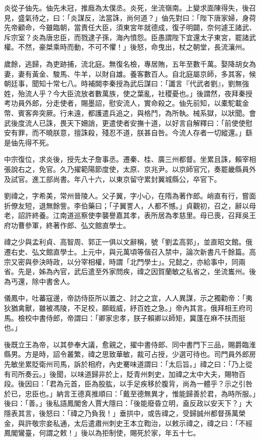 \begin{pinyinscope}
 炎從子伷先。伷先未冠，推廕為太僕丞。炎死，坐流嶺南。上變求面陳得失，後召見，盛氣待之，曰：「炎謀反，法當誅，尚何道？」伷先對曰：「陛下唐家婦，身荷先帝顧命，今雖臨朝，當責任大臣，須東宮年就德成，復子明闢，奈何遽王諸武、斥宗室？炎為唐忠臣，而戮逮子孫，海內憤怨。臣愚謂陛下宜還太子東宮，罷諸武權。不然，豪桀乘時而動，不可不懼！」後怒，命曳出，杖之朝堂，長流瀼州。



 歲餘，逃歸，為吏跡捕，流北庭。無復名檢，專居賄，五年至數千萬。娶降胡女為妻，妻有黃金、駿馬、牛羊，以財自雄。養客數百人。自北庭屬京師，多其客，候朝廷事，聞知十常七八。時補闕李秦授為武后謀曰：「讖言『代武者劉』，劉無強姓，殆流人乎？今大臣流放者數萬族，使之葉亂，社稷憂也。」後謂然，夜拜秦授考功員外郎，分走使者，賜墨詔，慰安流人，實命殺之。伷先前知，以橐駝載金幣、賓客奔突厥。行未遠，都護遣兵追之，與格鬥，為所執。械系獄，以狀聞。會武後度流人已誅，畏天下姍誚，更遣使者安撫十道，以好言自解釋曰：「前使使慰安有罪，而不曉朕意，擅誅殺，殘忍不道，朕甚自咎。今流人存者一切縱還。」繇是伷先得不死。



 中宗復位，求炎後，授先太子詹事丞。遷秦、桂、廣三州都督。坐累且誅，賴宰相張說右之，免官。久乃擢範陽節度使，太原、京兆尹。以京師官冗，奏罷畿縣員外及試官。進工部尚書。年八十六，以東京留守累封翼城縣公，卒官下。



 劉禕之，字希美，常州晉陵人。父子翼，字小心，在隋為著作郎。峭直有行，嘗面折僚友短，退無餘訾。李伯藥曰；「子翼詈人，人都不憾。」貞觀初，召之，辭以母老，詔許終養。江南道巡察使李襲譽嘉其孝，表所居為孝慈里。母已喪，召拜吳王府功曹參軍，終著作郎、弘文館直學士。



 禕之少與孟利貞、高智周、郭正一俱以文辭稱，號「劉孟高郭」，並直昭文館。俄遷右史、弘文館直學士。上元中，與元萬頃等偕召入禁中，論次新書凡千餘篇。高宗又密與參決時政，以分宰相權，時謂「北門學士」。兄懿之，亦給事中，同兩省。先是，姊為內官，武后遣至外家問疾，禕之因賀蘭敏之私省之，坐流巂州。後為丐還，除中書舍人。



 儀鳳中，吐蕃寇邊，帝訪侍臣所以置之、討之之宜，人人異謀，示之獨勸帝：「夷狄猶禽獸，雖被馮陵，不足校，願戢威，紓百姓之急。」帝內其言。俄拜相王府司馬。檢校中書侍郎，帝謂曰：「卿家忠孝，朕子賴卿以師矩，冀蓬在麻不扶而挺也。」



 後既立王為帝，以其參奉大議，愈親之，擢中書侍郎、同中書門下三品，賜爵臨淮縣男。方是時，詔令叢繁，禕之思致華敏，裁可占授，少選可待也。司門員外郎房先敏坐累貶衛州司馬，訴於相府，內史騫味道謂曰：「太后旨。」禕之曰：「乃上從有司所奏云。」後聞，以味道歸非於上，貶青州刺史，加禕之太中大夫，賜物百段。後因曰：「君為元首，臣為股肱，以手足疾移於腹背，尚為一體乎？示之引咎於已，忠臣也。」納言王德真推順曰：「戴至德無異才，惟能歸善於君，為時所服。」後曰：「善。」後私語鳳閣舍人賈大隱曰：「後能廢昏立明，盍反政以安天下？」大隱表其言，後怒曰：「禕之乃負我！」垂拱中，或告禕之，受歸誠州都督孫萬榮金，與許敬宗妾私通，太后遣肅州刺史王本立鞫治，以敕示禕之，禕之曰：「不經鳳閣鸞臺，何謂之敕！」後以為拒制使，賜死於家，年五十七。




\end{pinyinscope}

